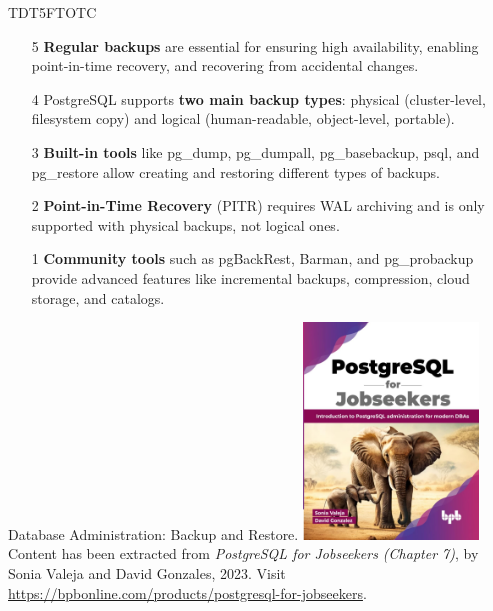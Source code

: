 \documentclass[aspectratio=169]{beamer}
\begin{document}
\begin{frame}{TDT5FTOTC}
    \pause
    \begin{itemize}
        \item[5] \textbf{Regular backups} are essential for ensuring high availability, enabling point-in-time recovery, and recovering from accidental changes. \pause

        \item[4] PostgreSQL supports \textbf{two main backup types}: physical (cluster-level, filesystem copy) and logical (human-readable, object-level, portable). \pause

        \item[3] \textbf{Built-in tools} like pg\_dump, pg\_dumpall, pg\_basebackup, psql, and pg\_restore allow creating and restoring different types of backups. \pause

        \item[2] \textbf{Point-in-Time Recovery} (PITR) requires WAL archiving and is only supported with physical backups, not logical ones. \pause

        \item[1] \textbf{Community tools} such as pgBackRest, Barman, and pg\_probackup provide advanced features like incremental backups, compression, cloud storage, and catalogs.
    \end{itemize}
\end{frame}

\begin{frame}{Database Administration: Backup and Restore.}
    \centering
    \includegraphics[width=0.35\textwidth]{figures/book_cover}\\
    \vspace{2mm}
    {
        \scriptsize
        Content has been extracted from \textit{PostgreSQL for Jobseekers (Chapter 7)}, by Sonia Valeja and David Gonzales, 2023.  Visit \url{https://bpbonline.com/products/postgresql-for-jobseekers}.\\
    }
\end{frame}
\end{document}
